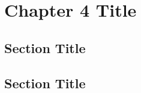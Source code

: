 \documentclass[../main.tex]{subfiles}
\begin{document}
\newpage
\onehalfspacing
\RaggedRight
\setcounter{chapter}{3}
\thesischapterstyle

\chapter{Chapter 4 Title}\label{chap4:short-label}

\section{Section Title}
\lipsum[1]

\section{Section Title}
\lipsum[2]
\end{document}
